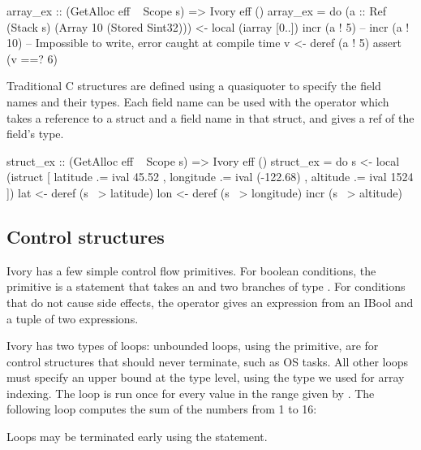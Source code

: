 \begin{code}
array_ex :: (GetAlloc eff ~ Scope s) => Ivory eff ()
array_ex = do
  (a :: Ref (Stack s) (Array 10 (Stored Sint32))) <- local (iarray [0..])
  incr (a ! 5)
  -- incr (a ! 10) -- Impossible to write, error caught at compile time
  v <- deref (a ! 5)
  assert (v ==? 6)

\end{code}

Traditional C structures are defined using a quasiquoter to specify the field
names and their types. Each field name can be used with the \cd{~>} operator
which takes a reference to a struct and a field name in that struct, and gives
a ref of the field's type.

\begin{code}

struct_ex :: (GetAlloc eff ~ Scope s) => Ivory eff ()
struct_ex = do
  s <- local (istruct [ latitude .= ival 45.52
                      , longitude .= ival (-122.68)
                      , altitude .= ival 1524 ])
  lat <- deref (s ~> latitude)
  lon <- deref (s ~> longitude)
  incr (s ~> altitude)
\end{code}


\subsection{Control structures}

Ivory has a few simple control flow primitives. For boolean conditions,
the  primitive is a statement that takes an  and two
branches of type . For conditions that do not cause side
effects, the  operator gives an expression from an IBool and a tuple
of two expressions.


Ivory has two types of loops: unbounded loops, using the  primitive,
are for control structures that should never terminate, such as OS tasks. All
other loops must specify an upper bound at the type level, using the  type
we used for array indexing. The  loop is run once for every value
in the range given by . The following loop computes the sum of the
numbers from 1 to 16:


Loops may be terminated early using the  statement.

